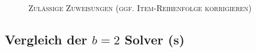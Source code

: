 \begin{figure}[H]
  \centering
    \caption*{\textsc{Zulässige Zuweisungen (ggf. Item-Reihenfolge korrigieren)}}
\end{figure}

\pagebreak

\subsection{Vergleich der $b = 2$ Solver (s)}
\label{sec:solver_comp_b=2_s}

